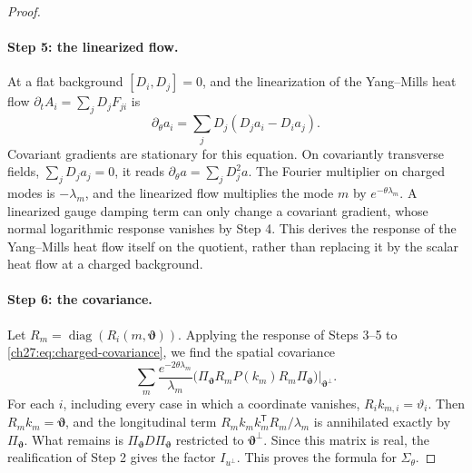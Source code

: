 \begin{proof}
\paragraph{Step 5: the linearized flow.}
At a flat background $[D_i,D_j]=0$, and the linearization of the Yang--Mills heat flow $\partial_tA_i=\sum_jD_jF_{ji}$ is
\[
 \partial_\theta a_i=\sum_jD_j(D_ja_i-D_ia_j).
\]
Covariant gradients are stationary for this equation. On covariantly transverse fields, $\sum_jD_ja_j=0$, it reads $\partial_\theta a=\sum_jD_j^2a$. The Fourier multiplier on charged modes is $-\lambda_m$, and the linearized flow multiplies the mode $m$ by $e^{-\theta\lambda_m}$. A linearized gauge damping term can only change a covariant gradient, whose normal logarithmic response vanishes by Step 4. This derives the response of the Yang--Mills heat flow itself on the quotient, rather than replacing it by the scalar heat flow at a charged background.

\paragraph{Step 6: the covariance.}
Let $R_m=\operatorname{diag}(R_i(m,\bm\vartheta))$. Applying the response of Steps 3--5 to \eqref{ch27:eq:charged-covariance}, we find the spatial covariance
\[
 \sum_m\frac{e^{-2\theta\lambda_m}}{\lambda_m}\bigl(\Pi_{\bm\vartheta}R_mP(k_m)R_m\Pi_{\bm\vartheta}\bigr)\big|_{\bm\vartheta^\perp}.
\]
For each $i$, including every case in which a coordinate vanishes, $R_ik_{m,i}=\vartheta_i$. Then $R_mk_m=\bm\vartheta$, and the longitudinal term $R_mk_mk_m^{\mathsf T}R_m/\lambda_m$ is annihilated exactly by $\Pi_{\bm\vartheta}$. What remains is $\Pi_{\bm\vartheta}D\Pi_{\bm\vartheta}$ restricted to $\bm\vartheta^\perp$. Since this matrix is real, the realification of Step 2 gives the factor $I_{u^\perp}$. This proves the formula for $\Sigma_\theta$.


\end{proof}
